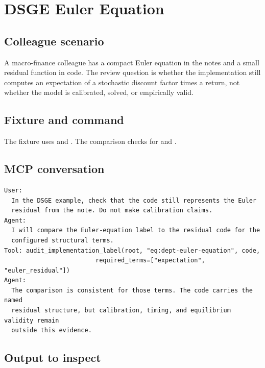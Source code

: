 \documentclass[12pt,a4paper,openany]{book}
\begin{document}
\chapter{DSGE Euler Equation}

\section*{Colleague scenario}

A macro-finance colleague has a compact Euler equation in the notes and a small
residual function in code. The review question is whether the implementation
still computes an expectation of a stochastic discount factor times a return,
not whether the model is calibrated, solved, or empirically valid.

\section*{Fixture and command}

The fixture uses  and
. The comparison checks
 for  and
.

\section*{MCP conversation}

\begin{lstlisting}[basicstyle=\ttfamily\scriptsize]
User:
  In the DSGE example, check that the code still represents the Euler
  residual from the note. Do not make calibration claims.
Agent:
  I will compare the Euler-equation label to the residual code for the
  configured structural terms.
Tool: audit_implementation_label(root, "eq:dept-euler-equation", code,
                         required_terms=["expectation", "euler_residual"])
Agent:
  The comparison is consistent for those terms. The code carries the named
  residual structure, but calibration, timing, and equilibrium validity remain
  outside this evidence.
\end{lstlisting}



\section*{Output to inspect}
\end{document}
